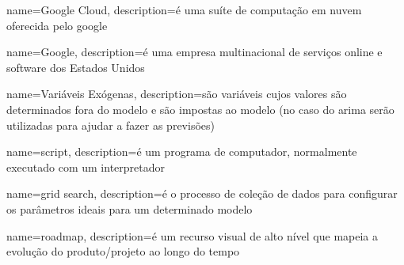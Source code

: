 {
    name={Google Cloud},
    description={é uma suíte de computação em nuvem oferecida pelo \gls{google}}
}

{
    name={Google},
    description={é uma empresa multinacional de serviços online e software dos
    Estados Unidos}
}

{
    name={Variáveis Exógenas},
    description={são variáveis cujos valores são determinados fora do modelo e são
    impostas ao modelo (no caso do \acrshort{arima} serão utilizadas para ajudar a fazer
    as previsões)}
}

{
    name={script},
    description={é um programa de computador, normalmente executado com um interpretador}
}

{
    name={grid search},
    description={é o processo de coleção de dados para configurar os parâmetros ideais para
    um determinado modelo}
}

{
    name={roadmap},
    description={é um recurso visual de alto nível que mapeia a evolução do produto/projeto
    ao longo do tempo}
}

